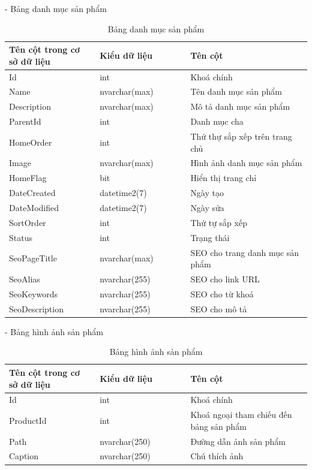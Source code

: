 - Bảng danh mục sản phẩm
\begin{longtable}[htp]{ |m{0.3\linewidth}|m{0.3\linewidth}|m{0.4\linewidth}|}
\caption{Bảng danh mục sản phẩm \label{database}}\\
\hline
Tên cột trong cơ sở dữ liệu & Kiểu dữ liệu & Tên cột  \\
\hline
Id&int&Khoá chính\\
\hline
Name&nvarchar(max)&Tên danh mục sản phẩm\\
\hline
Description&nvarchar(max)&Mô tả danh mục sản phẩm\\
\hline
ParentId&int&Danh mục cha\\
\hline
HomeOrder&int&Thứ thự sắp xếp trên trang chủ\\
\hline
Image&nvarchar(max)&Hình ảnh danh mục sản phẩm\\
\hline
HomeFlag&bit&Hiển thị trang chỉ\\
\hline
DateCreated&datetime2(7)&Ngày tạo\\
\hline
DateModified&datetime2(7)&Ngày sửa\\
\hline
SortOrder&int&Thứ tự sắp xếp\\
\hline
Status&int&Trạng thái\\
\hline
 SeoPageTitle&nvarchar(max)&SEO cho trang danh mục sản phẩm\\
 \hline
 SeoAlias&nvarchar(255)&SEO cho link URL\\
 \hline
 SeoKeywords&nvarchar(255)&SEO cho từ khoá\\
 \hline
 SeoDescription&nvarchar(255)&SEO cho mô tả \\
 \hline
\end{longtable}

- Bảng hình ảnh sản phẩm
\begin{longtable}[htp]{ |m{0.3\linewidth}|m{0.3\linewidth}|m{0.4\linewidth}|}
\caption{Bảng hình ảnh sản phẩm \label{database}}\\
\hline
Tên cột trong cơ sở dữ liệu & Kiểu dữ liệu & Tên cột  \\
\hline
Id&int&Khoá chính\\
\hline
ProductId&int&Khoá ngoại tham chiếu đến bảng sản phẩm\\
\hline
Path&nvarchar(250)&Đường dẫn ảnh sản phẩm\\
\hline
Caption&nvarchar(250)&Chú thích ảnh\\
\hline
\end{longtable}


